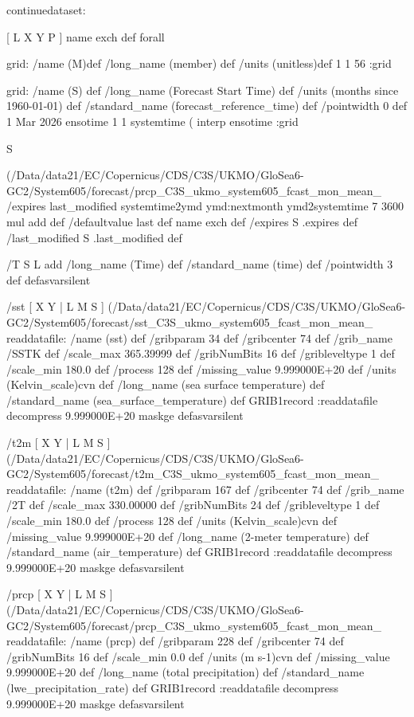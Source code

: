 \begin{ingrid}

continuedataset:

[ L X Y P ] { name exch def } forall

grid:
/name (M)def
/long_name (member) def
/units (unitless)def
1 1 56
:grid

grid:
/name (S) def
/long_name (Forecast Start Time) def
/units (months since 1960-01-01) def
/standard_name (forecast_reference_time) def
/pointwidth 0 def
1 Mar 2026 ensotime
1
1 systemtime (%
interp
ensotime
:grid

S { (/Data/data21/EC/Copernicus/CDS/C3S/UKMO/GloSea6-GC2/System605/forecast/prcp_C3S_ukmo_system605_fcast_mon_mean_%
/expires
last_modified systemtime2ymd ymd:nextmonth
ymd2systemtime 7 3600 mul add
def
/defaultvalue last def
name exch def
/expires S .expires def
/last_modified S .last_modified def

/T { S L add
/long_name (Time) def
/standard_name (time) def 
/pointwidth 3 def
} defasvarsilent

/sst { [ X Y | L M S ] (/Data/data21/EC/Copernicus/CDS/C3S/UKMO/GloSea6-GC2/System605/forecast/sst_C3S_ukmo_system605_fcast_mon_mean_%
 readdatafile:
 /name (sst) def
 /gribparam 34 def
 /gribcenter 74 def
 /grib_name /SSTK def
 /scale_max 365.39999 def
 /gribNumBits 16 def
 /gribleveltype 1 def
 /scale_min 180.0 def
 /process 128 def
 /missing_value 9.999000E+20 def
 /units (Kelvin_scale)cvn def
 /long_name (sea surface temperature) def
 /standard_name (sea_surface_temperature) def
 GRIB1record :readdatafile
 decompress
 9.999000E+20 maskge
}defasvarsilent

/t2m { [ X Y | L M S ] (/Data/data21/EC/Copernicus/CDS/C3S/UKMO/GloSea6-GC2/System605/forecast/t2m_C3S_ukmo_system605_fcast_mon_mean_%
 readdatafile:
 /name (t2m) def
 /gribparam 167 def
 /gribcenter 74 def
 /grib_name /2T def
 /scale_max 330.00000 def
 /gribNumBits 24 def
 /gribleveltype 1 def
 /scale_min 180.0 def
 /process 128 def
 /units (Kelvin_scale)cvn def
 /missing_value 9.999000E+20 def
 /long_name (2-meter temperature) def
 /standard_name (air_temperature) def
 GRIB1record :readdatafile
 decompress
 9.999000E+20 maskge
}defasvarsilent

/prcp {
[ X Y | L M S ] (/Data/data21/EC/Copernicus/CDS/C3S/UKMO/GloSea6-GC2/System605/forecast/prcp_C3S_ukmo_system605_fcast_mon_mean_%
 readdatafile:
 /name (prcp) def
 /gribparam 228 def
 /gribcenter 74 def
 /gribNumBits 16 def
 /scale_min 0.0 def
 /units (m s-1)cvn def
 /missing_value 9.999000E+20 def
 /long_name (total precipitation) def
 /standard_name (lwe_precipitation_rate) def
 GRIB1record :readdatafile
 decompress
 9.999000E+20 maskge
}defasvarsilent

}
\end{ingrid}
